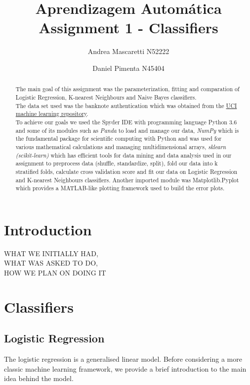 \documentclass[a4paper]{article}
\title{\textbf{Aprendizagem Automática} \\
\large Assignment 1 - Classifiers}
\author{Andrea Mascaretti N52222\and Daniel Pimenta N45404}
\begin{document}
\maketitle

\begin{abstract}
The main goal of this assignment was the parameterization, fitting and comparation of Logistic Regression,
 K-nearest Neighbours and Naive Bayes classifiers.\\ 
The data set used was the banknote authentication which was obtained from the
 \hyperref['https://archive.ics.uci.edu/ml/datasets/banknote+authentication]{UCI machine learning repository}.\\
To achieve our goals we used the Spyder IDE with programming language Python 3.6 and some of its modules 
such as \textit{Panda} to load and manage our data, \textit{NumPy} which is the fundamental package for 
scientific computing with Python and was used for various mathematical calculations and managing multidimensional 
arrays, \textit{sklearn (scikit-learn)} which has efficient tools for data mining and data analysis used in our assignment 
to preprocess data (shuffle, standardize, split), fold our data into k stratified folds, calculate cross validation score and 
fit our data on Logistic Regression and K-nearest Neighbours classifiers. Another imported module was Matplotlib.Pyplot
 which provides a MATLAB-like plotting framework used to build the error plots. 
\end{abstract}

\section{Introduction}

WHAT WE INITIALLY HAD,\\
WHAT WAS ASKED TO DO,\\
HOW WE PLAN ON DOING IT\\

\section{Classifiers}

\subsection{Logistic Regression}

The logistic regression is a generalised linear model. Before considering
a more classic machine learning framework, we provide a brief introduction
to the main idea behind the model. 
\end{document}
